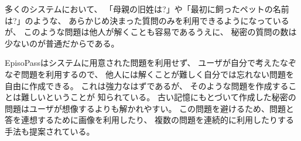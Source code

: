 \documentclass[twoside]{wiss}
\begin{document}
多くのシステムにおいて、
「母親の旧姓は?」や「最初に飼ったペットの名前は?」のような、
あらかじめ決まった質問のみを利用できるようになっているが、
このような問題は他人が解くことも容易であるうえに、
秘密の質問の数は少ないのが普通だからである\cite{Rabkin:2008:PKQ:1408664.1408667}。

EpisoPassはシステムに用意された問題を利用せず、
ユーザが自分で考えたなぞなぞ問題を利用するので、
他人には解くことが難しく自分では忘れない問題を自由に作成できる。
これは強力なはずであるが、
そのような問題を作成することは難しいということが
知られている\cite{Just:2009:PCC:1572532.1572543}\cite{Schechter:2009:NSM:1607723.1608145}。
%
%
%
古い記憶にもとづいて作成した秘密の問題はユーザが想像するよりも解かれやすい。
この問題を避けるため、問題と答を連想するために画像を利用したり、
複数の問題を連続的に利用したりする手法も提案されている\cite{Renaud:2010:PQE:2146303.2146318}。





\end{document}

